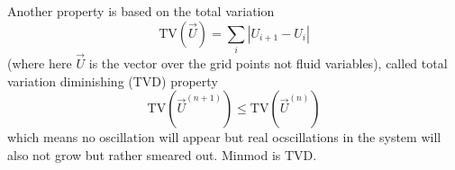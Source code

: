 Another property is based on the total variation
\begin{equation}
    \text{TV}(\vec{U}) = \sum_i \left| U_{i+1} - U_i \right|
\end{equation}
(where here $\vec{U}$ is the vector over the grid points not fluid variables),
called total variation diminishing (TVD) property
\begin{equation}
    \text{TV}(\vec{U}^{(n+1)}) \leq \text{TV}(\vec{U}^{(n)})
\end{equation}
which means no oscillation will appear but real ocscillations
in the system will also not grow but rather smeared out.
Minmod is TVD.

